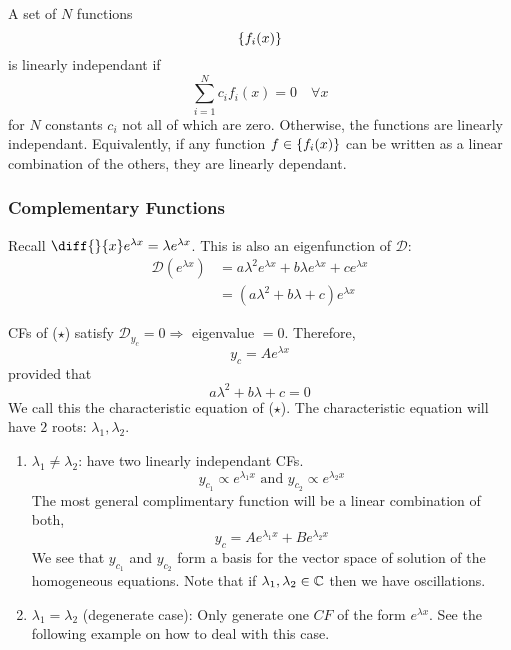 \documentclass{article}
\begin{document}
\begin{defi}
    A set of $N$ functions
    \[
        \left\{ f_i(x) \right\}
    \]
    is linearly independant if
    \[
        \sum_{i=1}^{N} c_i f_i(x) = 0 \quad \forall x
    \]
    for $N$ constants $c_i$ not all of which are zero.
    Otherwise, the functions are linearly independant.
    Equivalently, if any function $f \in \left\{ f_i(x) \right\}$ can be written as a linear combination of the others, 
    they are linearly dependant.
\end{defi}
\subsubsection{Complementary Functions}
Recall $\diff {}{x} e^{\lambda x} = \lambda e^{\lambda x}$.
This is also an eigenfunction of $\mathcal{D}$:
\begin{align*}
    \mathcal{D}(e^{\lambda x}) &= a \lambda^2 e^{\lambda x} + b \lambda e^{\lambda x} + c e^{\lambda x}\\
    &= (a \lambda^2 + b \lambda + c)e^{\lambda x}
\end{align*}

CFs of ($\star$) satisfy $\mathcal{D}_{y_c} = 0 \Rightarrow$ eigenvalue $=0$.
Therefore, 
\[
    y_c = A e^{\lambda x}    
\]
provided that
\[
    a \lambda^2 + b \lambda + c = 0
\]
We call this the characteristic equation of ($\star$). The characteristic equation will have $2$ roots: $\lambda_1, \lambda_2$.

\begin{enumerate}[cases]
    \item $\lambda_1 \neq \lambda_2$: have two linearly independant CFs.
    \[
        y_{c_1} \propto e^{\lambda_1 x} \text{ and }  y_{c_2} \propto e^{\lambda_2 x}
    \]
    The most general complimentary function will be a linear combination of both,
    \[
        y_c = A e^{\lambda_1 x} + B e^{\lambda_2 x}
    \]
    We see that $y_{c_1}$ and $y_{c_2}$ form a basis for the vector space of solution of the homogeneous equations.
    Note that if $\lambda_1, \lambda_2 \in \mathbb{C}$ then we have oscillations.

    \item $\lambda_1 = \lambda_2$ (degenerate case): Only generate one $CF$ of the form $e^{\lambda x}$. 
    See the following example on how to deal with this case.
\end{enumerate}
\end{document}
